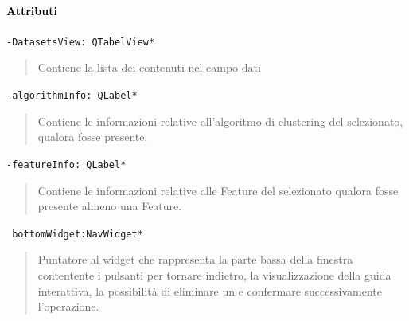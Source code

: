\paragraph{\textcolor{black}{Attributi\\}}

\color{teal}\verb!-DatasetsView: QTabelView*!
\color{black}
\begin{quote}
Contiene la lista dei \dataset{} contenuti nel campo dati 
\end{quote}
\color{teal}\verb!-algorithmInfo: QLabel*!
\color{black}
\begin{quote}
Contiene le informazioni relative all'algoritmo di clustering\g{} del \protocol{} selezionato, qualora fosse presente.
\end{quote}
\color{teal}\verb!-featureInfo: QLabel*!
\color{black}
\begin{quote}
Contiene le informazioni relative alle Feature\g{} del \protocol{} selezionato qualora fosse presente almeno una Feature\g{}.
\end{quote}
\color{teal}\verb! bottomWidget:NavWidget*!
\color{black} 
\begin{quote}
Puntatore al widget che rappresenta la parte bassa della finestra contentente i pulsanti per tornare indietro, la visualizzazione della guida interattiva, la possibilità di eliminare un \dataset{} e confermare successivamente l'operazione.
\end{quote}
